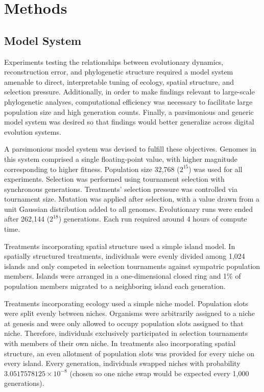 \section{Methods}
\label{sec:methods}

\subsection{Model System}

Experiments testing the relationships between evolutionary dynamics, reconstruction error, and phylogenetic structure required a model system amenable to direct, interpretable tuning of ecology, spatial structure, and selection pressure.
Additionally, in order to make findings relevant to large-scale phylogenetic analyses, computational efficiency was necessary to facilitate large population size and high generation counts.
Finally, a parsimonious and generic model system was desired so that findings would better generalize across digital evolution systems.

A parsimonious model system was devised to fulfill these objectives.
Genomes in this system comprised a single floating-point value, with higher magnitude corresponding to higher fitness.
Population size 32,768 ($2^{15}$) was used for all experiments.
Selection was performed using tournament selection with synchronous generations.
Treatments' selection pressure was controlled via tournament size.
Mutation was applied after selection, with a value drawn from a unit Gaussian distribution added to all genomes.
Evolutionary runs were ended after 262,144 ($2^{18}$) generations.
Each run required around 4 hours of compute time.

Treatments incorporating spatial structure used a simple island model.
In spatially structured treatments, individuals were evenly divided among 1,024 islands and only competed in selection tournaments against sympatric population members.
Islands were arranged in a one-dimensional closed ring and 1\% of population members migrated to a neighboring island each generation.

Treatments incorporating ecology used a simple niche model.
Population slots were split evenly between niches.
Organisms were arbitrarily assigned to a niche at genesis and were only allowed to occupy population slots assigned to that niche.
Therefore, individuals exclusively participated in selection tournaments with members of their own niche.
In treatments also incorporating spatial structure, an even allotment of population slots was provided for every niche on every island.
Every generation, individuals swapped niches with probability $3.0517578125 \times 10^{-8}$ (chosen so one niche swap would be expected every 1,000 generations).

